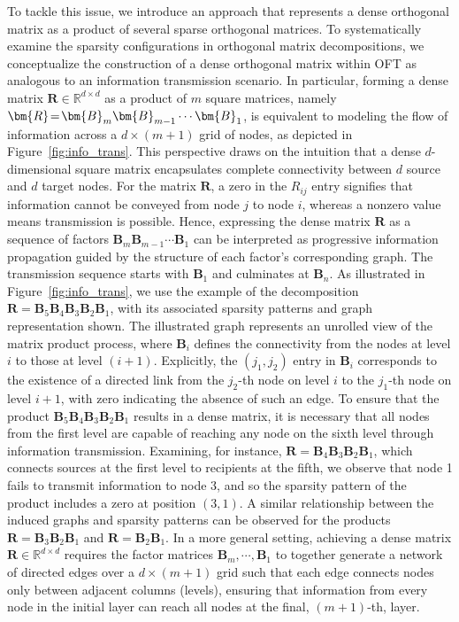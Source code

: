 To tackle this issue, we introduce an approach that represents a dense orthogonal matrix as a product of several sparse orthogonal matrices. To systematically examine the sparsity configurations in orthogonal matrix decompositions, we conceptualize the construction of a dense orthogonal matrix within OFT as analogous to an information transmission scenario. In particular, forming a dense matrix $\bm{R}\in\mathbb{R}^{d\times d}$ as a product of $m$ square matrices, namely $\thickmuskip=2mu \medmuskip=2mu \bm{R}=\bm{B}_m\bm{B}_{m-1}\cdots\bm{B}_1$, is equivalent to modeling the flow of information across a $d\times (m+1)$ grid of nodes, as depicted in Figure~\ref{fig:info_trans}. This perspective draws on the intuition that a dense $d$-dimensional square matrix encapsulates complete connectivity between $d$ source and $d$ target nodes. For the matrix $\bm{R}$, a zero in the $R_{ij}$ entry signifies that information cannot be conveyed from node $j$ to node $i$, whereas a nonzero value means transmission is possible. Hence, expressing the dense matrix $\bm{R}$ as a sequence of factors $\bm{B}_m\bm{B}_{m-1}\cdots\bm{B}_1$ can be interpreted as progressive information propagation guided by the structure of each factor’s corresponding graph. The transmission sequence starts with $\bm{B}_1$ and culminates at $\bm{B}_n$. As illustrated in Figure~\ref{fig:info_trans}, we use the example of the decomposition $\bm{R}=\bm{B}_5\bm{B}_4\bm{B}_3\bm{B}_2\bm{B}_1$, with its associated sparsity patterns and graph representation shown. The illustrated graph represents an unrolled view of the matrix product process, where $\bm{B}_i$ defines the connectivity from the nodes at level $i$ to those at level $(i+1)$. Explicitly, the $(j_1, j_2)$ entry in $\bm{B}_i$ corresponds to the existence of a directed link from the $j_2$-th node on level $i$ to the $j_1$-th node on level $i+1$, with zero indicating the absence of such an edge. To ensure that the product $\bm{B}_5\bm{B}_4\bm{B}_3\bm{B}_2\bm{B}_1$ results in a dense matrix, it is necessary that all nodes from the first level are capable of reaching any node on the sixth level through information transmission. Examining, for instance, $\bm{R}=\bm{B}_4\bm{B}_3\bm{B}_2\bm{B}_1$, which connects sources at the first level to recipients at the fifth, we observe that node 1 fails to transmit information to node 3, and so the sparsity pattern of the product includes a zero at position $(3,1)$. A similar relationship between the induced graphs and sparsity patterns can be observed for the products $\bm{R}=\bm{B}_3\bm{B}_2\bm{B}_1$ and $\bm{R}=\bm{B}_2\bm{B}_1$. In a more general setting, achieving a dense matrix $\bm{R}\in\mathbb{R}^{d\times d}$ requires the factor matrices $\bm{B}_m,\cdots,\bm{B}_1$ to together generate a network of directed edges over a $d\times (m+1)$ grid such that each edge connects nodes only between adjacent columns (levels), ensuring that information from every node in the initial layer can reach all nodes at the final, $(m+1)$-th, layer.

